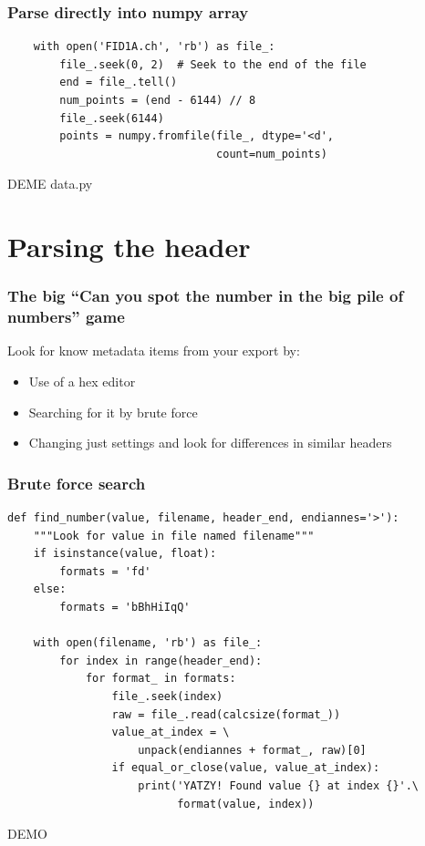 \documentclass{beamer}
\begin{document}
\begin{frame}[fragile]
  \frametitle{Parse directly into numpy array}
  \begin{verbatim}
    with open('FID1A.ch', 'rb') as file_:
        file_.seek(0, 2)  # Seek to the end of the file
        end = file_.tell()
        num_points = (end - 6144) // 8
        file_.seek(6144)
        points = numpy.fromfile(file_, dtype='<d',
                                count=num_points)
  \end{verbatim}
  \vspace{1cm}
  \huge DEME data.py
\end{frame}

\section{Parsing the header}
\begin{frame}
  \frametitle{The big ``Can you spot the number in the big pile of numbers'' game}
  \LARGE
  \begin{block}{Look for know metadata items from your export by:}
  \begin{itemize}
  \item Use of a hex editor
  \item Searching for it by brute force
  \item Changing just settings and look for differences in similar headers
  \end{itemize}    
  \end{block}
\end{frame}

\begin{frame}[fragile]
  \frametitle{Brute force search}
  \small
  \begin{verbatim}
def find_number(value, filename, header_end, endiannes='>'):
    """Look for value in file named filename"""
    if isinstance(value, float):
        formats = 'fd'
    else:
        formats = 'bBhHiIqQ'

    with open(filename, 'rb') as file_:
        for index in range(header_end):
            for format_ in formats:
                file_.seek(index)
                raw = file_.read(calcsize(format_))
                value_at_index = \
                    unpack(endiannes + format_, raw)[0]
                if equal_or_close(value, value_at_index):
                    print('YATZY! Found value {} at index {}'.\
                          format(value, index))
  \end{verbatim}
  \LARGE DEMO
\end{frame}
\end{document}
